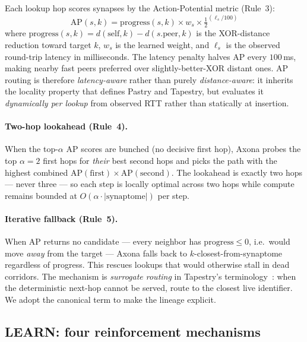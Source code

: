 \documentclass[conference]{IEEEtran}
\newcommand{\axona}{Axona\xspace}
\begin{document}
Each lookup hop scores synapses by the Action-Potential metric (Rule~3):
\begin{equation}
\mathrm{AP}(s, k) = \mathrm{progress}(s, k) \times w_s \times \tfrac{1}{2}^{(\ell_s / 100)}
\label{eq:ap}
\end{equation}
where $\mathrm{progress}(s, k) = d(\mathrm{self}, k) - d(s.\mathrm{peer}, k)$
is the XOR-distance reduction toward target $k$, $w_s$ is the learned
weight, and $\ell_s$ is the observed round-trip latency in milliseconds.
The latency penalty halves AP every $100$\,ms, making nearby fast peers
preferred over slightly-better-XOR distant ones. AP routing is therefore
\emph{latency-aware} rather than purely \emph{distance-aware}: it inherits
the locality property that defines Pastry and Tapestry, but evaluates it
\emph{dynamically per lookup} from observed RTT rather than statically at
insertion.

\paragraph{Two-hop lookahead (Rule~4).}
When the top-$\alpha$ AP scores are bunched (no decisive first hop),
\axona probes the top $\alpha = 2$ first hops for \emph{their} best
second hops and picks the path with the highest combined
$\mathrm{AP}(\mathrm{first}) \times \mathrm{AP}(\mathrm{second})$. The
lookahead is exactly two hops --- never three --- so each step is
locally optimal across two hops while compute remains bounded at
$O(\alpha \cdot |\mathrm{synaptome}|)$ per step.

\paragraph{Iterative fallback (Rule~5).}
When AP returns no candidate --- every neighbor has $\mathrm{progress} \le 0$,
i.e.\ would move \emph{away} from the target --- \axona falls back to
$k$-closest-from-synaptome regardless of progress. This rescues lookups
that would otherwise stall in dead corridors. The mechanism is \emph{surrogate
routing} in Tapestry's terminology~\cite{zhao2004tapestry}: when the
deterministic next-hop cannot be served, route to the closest live
identifier. We adopt the canonical term to make the lineage explicit.

\subsection{LEARN: four reinforcement mechanisms}
\label{sec:nh1-learn}
\end{document}

